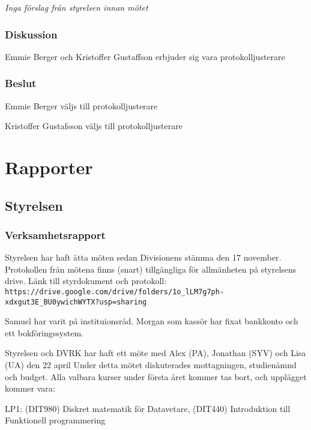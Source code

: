 \documentclass[protokoll]{dvd}
\begin{document}
\emph{Inga förslag från styrelsen innan mötet}

\subsubsection*{Diskussion}
Emmie Berger och Kristoffer Gustaffson erbjuder sig vara protokolljusterare

\subsubsection*{Beslut}

\begin{attsatser}
    \item Emmie Berger väljs till protokolljusterare
    \item Kristoffer Gustafsson väljs till protokolljusterare
\end{attsatser}

\newpage

\section{Rapporter}

\subsection{Styrelsen}

\subsubsection*{Verksamhetsrapport}

Styrelsen har haft åtta möten sedan Divisionens stämma den 17 november.
Protokollen från mötena finns (snart) tillgängliga för allmänheten på styrelsens drive.
Länk till styrdokument och protokoll: \verb|https://drive.google.com/drive/folders/1o_lLM7g7ph-xdxgut3E_BU0ywichWYTX?usp=sharing|

Samuel har varit på instituionsråd.
Morgan som kassör har fixat bankkonto och ett bokföringssystem.

Styrelsen och DVRK har haft ett möte med Alex (PA), Jonathan (SYV) och Lisa (UA) den 22 april
Under detta mötet diskuterades mottagningen, studienämnd och budget.
Alla valbara kurser under första året kommer tas bort, och upplägget kommer vara: 

LP1: (DIT980) Diskret matematik för Datavetare, (DIT440) Introduktion till Funktionell programmering 
\end{document}
